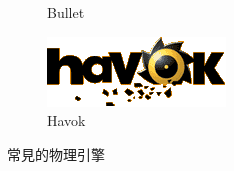 \begin{figure}[h]
\begin{subfigure}[b]{0.24\linewidth}
    \caption{Bullet}
    \end{subfigure}
    \begin{subfigure}[b]{0.24\linewidth}
    \includegraphics[width=\linewidth]{./resources/physics/havok(1).png}
    \caption{Havok}
    \end{subfigure}
\caption{常見的物理引擎}
\label{fig:Common_phyicalEnginie}
\end{figure}

